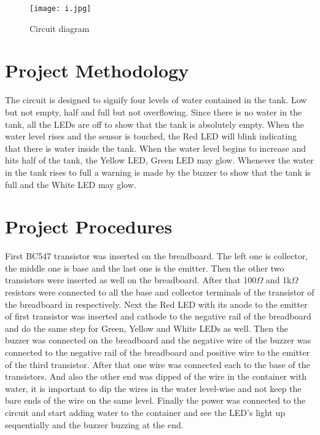\documentclass[12pt,a4paper,oneside]{book}
\theoremstyle{plain}
\numberwithin{equation}{chapter} \DeclareMathOperator{\Var}{Var}
\begin{document}
\begin{figure}[hbt!]
    \centering
    \texttt{[image: i.jpg]}
    \caption{Circuit diagram}
    \label{fig:i}
\end{figure}

\newpage
\section{Project Methodology}
The circuit is designed to signify four levels of water contained in the tank. Low but not empty, half and full but not overflowing. Since there is no water in the tank, all the LEDs are off to show that the tank is absolutely empty. When the water level rises and the sensor is touched, the Red LED will blink indicating that there is water inside the tank. When the water level begins to increase and hits 
half of the tank, the Yellow LED, Green LED may glow. Whenever the water in the tank rises to full a warning is made by the buzzer to show that the tank is full and  the White LED may glow.

\section{Project Procedures}
First BC547 transistor was inserted on the breadboard. The left one is collector, the middle one is base and the last one is the emitter. Then the other two transistors were inserted as well on the breadboard. After that 100$\Omega$ and 1k$\Omega$ resistors were connected to all the base and collector terminals of the transistor of the breadboard in respectively. Next the Red LED with its anode to the emitter of first transistor was inserted and cathode to the negative rail of the breadboard and do the same step for Green, Yellow and White LEDs as well. Then the buzzer was connected on the breadboard and  the negative wire of the buzzer was connected to the negative rail of the breadboard and positive wire to the emitter of the third transistor. After that one wire was connected each to the base of the transistors. And also the other end was dipped of the wire in the container with water, it is important to dip the wires in the water level-wise and not keep the bare ends of the wire on the same level. Finally the power was connected to the circuit and start adding water to the container and see the LED's light up sequentially and the buzzer buzzing at the end. 
\end{document}
